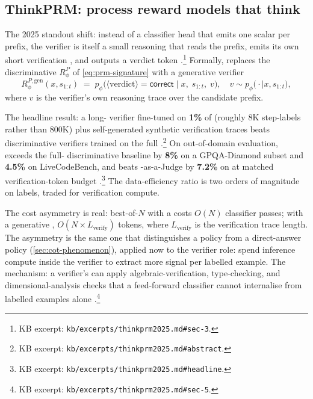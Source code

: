 \subsection{ThinkPRM: process reward models that think}
\label{sec:prm-thinkprm}

The 2025 standout shift: instead of a classifier head that emits one
scalar per prefix, the verifier is itself a small reasoning  that
reads the prefix, emits its own short verification ,
and outputs a verdict token \citep[\S 3]{thinkprm2025}.\footnote{KB
excerpt: \texttt{kb/excerpts/thinkprm2025.md\#sec-3}.} Formally,
 replaces the discriminative $R^P_\phi$ of \cref{eq:prm-signature}
with a generative verifier
\begin{equation}
  R^{P,\text{gen}}_\phi(x, s_{1:t}) \;=\; p_\phi\!\bigl(\langle\text{verdict}\rangle = \mathsf{correct} \;\big|\; x,\; s_{1:t},\; v\bigr), \quad v \sim p_\phi\!\bigl(\cdot \mid x, s_{1:t}\bigr),
  \label{eq:thinkprm-gen}
\end{equation}
where $v$ is the verifier's own reasoning trace over the candidate
prefix.

The headline result: a long- verifier fine-tuned on
\textbf{1\%} of  (roughly 8K step-labels rather than 800K)
plus self-generated synthetic verification traces beats discriminative
verifiers trained on the full 
\citep[abstract]{thinkprm2025}.\footnote{KB excerpt:
\texttt{kb/excerpts/thinkprm2025.md\#abstract}.} On out-of-domain
evaluation,  exceeds the full- discriminative baseline
by \textbf{8\%} on a GPQA-Diamond subset and \textbf{4.5\%} on
LiveCodeBench, and beats -as-a-Judge by \textbf{7.2\%} on
 at matched verification-token budget
\citep[abstract]{thinkprm2025}.\footnote{KB excerpt:
\texttt{kb/excerpts/thinkprm2025.md\#headline}.} The data-efficiency
ratio is two orders of magnitude on labels, traded for verification
compute.

The cost asymmetry is real: best-of-$N$ with a 
costs $O(N)$ classifier passes; with a generative ,
$O(N \times L_\text{verify})$ tokens, where $L_\text{verify}$ is the
verification trace length. The asymmetry is the same one that
distinguishes a  policy from a direct-answer policy
(\cref{sec:cot-phenomenon}), applied now to the verifier role: spend
inference compute inside the verifier to extract more signal per
labelled example. The mechanism: a verifier's  can apply
algebraic-verification, type-checking, and dimensional-analysis
checks that a feed-forward classifier cannot internalise from
labelled examples alone \citep[\S 5]{thinkprm2025}.\footnote{KB
excerpt: \texttt{kb/excerpts/thinkprm2025.md\#sec-5}.}

